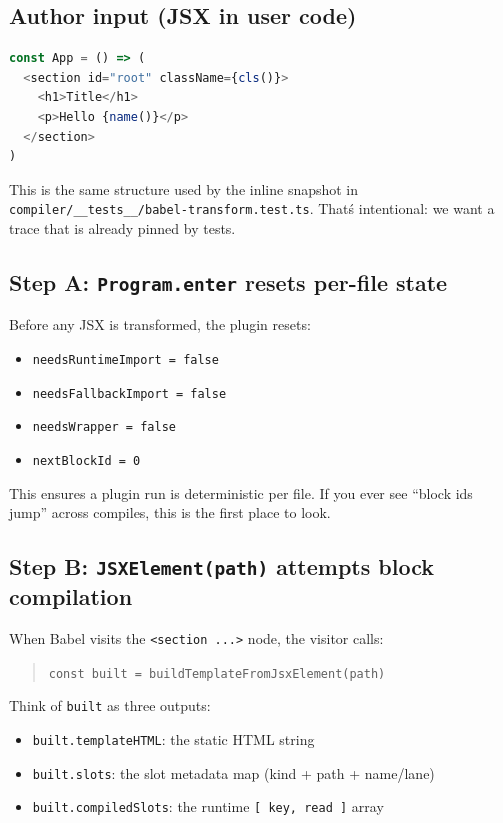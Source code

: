 \subsection{Author input (JSX in user code)}

\begin{lstlisting}[language=JavaScript]
const App = () => (
  <section id="root" className={cls()}>
    <h1>Title</h1>
    <p>Hello {name()}</p>
  </section>
)
\end{lstlisting}

This is the same structure used by the inline snapshot in
  \texttt{compiler/\_\_tests\_\_/babel-transform.test.ts}.
That\'s intentional: we want a trace that is already pinned by tests.

\subsection{Step A: \texttt{Program.enter} resets per-file state}

Before any JSX is transformed, the plugin resets:

\begin{itemize}
\item \texttt{needsRuntimeImport = false}
\item \texttt{needsFallbackImport = false}
\item \texttt{needsWrapper = false}
\item \texttt{nextBlockId = 0}
\end{itemize}

This ensures a plugin run is deterministic per file.
If you ever see ``block ids jump'' across compiles, this is the first place to look.

\subsection{Step B: \texttt{JSXElement(path)} attempts block compilation}

When Babel visits the \texttt{<section ...>} node, the visitor calls:

\begin{quote}
  \texttt{const built = buildTemplateFromJsxElement(path)}
\end{quote}

Think of \texttt{built} as three outputs:

\begin{itemize}
\item \texttt{built.templateHTML}: the static HTML string
\item \texttt{built.slots}: the slot metadata map (kind + path + name/lane)
\item \texttt{built.compiledSlots}: the runtime \texttt{[{ key, read }]} array
\end{itemize}

